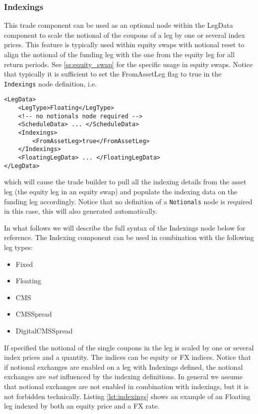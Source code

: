 \subsubsection{Indexings}
\label{ss:indexings}

This trade component can be used as an optional node within the LegData component to scale the notional of the coupons
of a leg by one or several index prices. This feature is typically used within equity swaps with notional reset to align
the notional of the funding leg with the one from the equity leg for all return periods. See \ref{ss:equity_swap} for
the specific usage in equity swaps. Notice that typically it is sufficient to set the FromAssetLeg flag to true in the
\verb+Indexings+ node definition, i.e.

\begin{verbatim}
<LegData>
    <LegType>Floating</LegType>
    <!-- no notionals node required -->
    <ScheduleData> ... </ScheduleData>
    <Indexings>
        <FromAssetLeg>true</FromAssetLeg>
    </Indexings>
    <FloatingLegData> ... </FloatingLegData>
</LegData>
\end{verbatim}

which will cause the trade builder to pull all the indexing details from the asset leg (the equity leg in an equity
swap) and populate the indexing data on the funding leg accordingly. Notice that no definition of a \verb+Notionals+
node is required in this case, this will also generated automatically.

In what follows we will describe the full syntax of the Indexings node below for reference. The Indexing component can
be used in combination with the following leg types:

\begin{itemize}
\item Fixed
\item Floating
\item CMS
\item CMSSpread
\item DigitalCMSSpread
\end{itemize}

If specified the notional of the single coupons in the leg is scaled by one or several index prices and a quantity. The
indices can be equity or FX indices. Notice that if notional exchanges are enabled on a leg with Indexings defined, the
notional exchanges are {\em not} influenced by the indexing definitions. In general we assume that notional exchanges
are not enabled in combination with indexings, but it is not forbidden technically. Listing \ref{lst:indexings} shows an
example of an Floating leg indexed by both an equity price and a FX rate.


